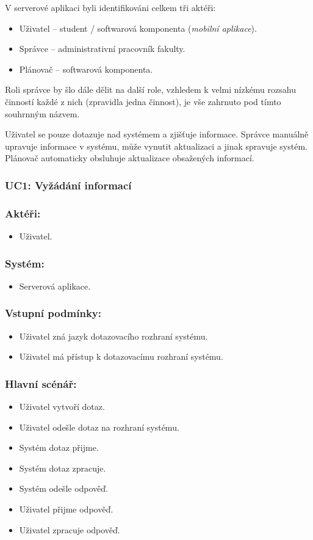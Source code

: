 V serverové aplikaci byli identifikováni celkem tři aktéři:
\begin{itemize}
 \item Uživatel -- student / softwarová komponenta (\textit{mobilní aplikace}).
 \item Správce -- administrativní pracovník fakulty.
 \item Plánovač -- softwarová komponenta.
\end{itemize}
Roli správce by šlo dále dělit na další role, vzhledem k velmi nízkému rozsahu činností každé z nich (zpravidla jedna činnost), je vše zahrnuto pod tímto souhrnným názvem.

Uživatel se pouze dotazuje nad systémem a zjišťuje informace. Správce manuálně upravuje informace v systému, může vynutit aktualizaci a jinak spravuje systém. Plánovač automaticky obsluhuje aktualizace obsažených informací.

\subsubsection{UC1: Vyžádání informací}
\subsubsection*{Aktéři:}
\begin{itemize}
 \item Uživatel.
\end{itemize}
\subsubsection*{Systém:}
\begin{itemize}
 \item Serverová aplikace.
\end{itemize}
\subsubsection*{Vstupní podmínky:}
\begin{itemize}
 \item Uživatel zná jazyk dotazovacího rozhraní systému.
 \item Uživatel má přístup k dotazovacímu rozhraní systému.
\end{itemize}
\subsubsection*{Hlavní scénář:}
\begin{itemize}
 \item Uživatel vytvoří dotaz.
 \item Uživatel odešle dotaz na rozhraní systému.
 \item Systém dotaz přijme.
 \item Systém dotaz zpracuje.
 \item Systém odešle odpověď.
 \item Uživatel přijme odpověď.
 \item Uživatel zpracuje odpověď.
\end{itemize}
